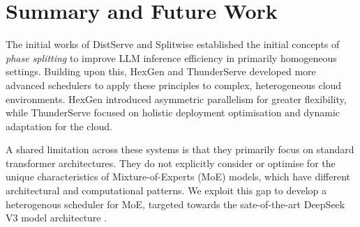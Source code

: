 \section{Summary and Future Work}

The initial works of DistServe \autocite{zhongDistServeDisaggregatingPrefill2024} and Splitwise \autocite{patelSplitwiseEfficientGenerative2024} established the initial concepts of \textit{phase splitting} to improve LLM inference efficiency in primarily homogeneous settings. 
Building upon this, HexGen \autocite{jiangHexGenGenerativeInference2024} and ThunderServe \autocite{jiangThunderServeHighperformanceCostefficient2025} developed more advanced schedulers to apply these principles to complex, heterogeneous cloud environments.
HexGen introduced asymmetric parallelism for greater flexibility, while ThunderServe focused on holistic deployment optimisation and dynamic adaptation for the cloud.

A shared limitation across these systems is that they primarily focus on standard transformer architectures.
They do not explicitly consider or optimise for the unique characteristics of Mixture-of-Experts (MoE) models, which have different architectural and computational patterns.
We exploit this gap to develop a heterogenous scheduler for MoE, targeted towards the sate-of-the-art DeepSeek V3 model architecture \autocite{deepseek-aiDeepSeekV3TechnicalReport2025}.
